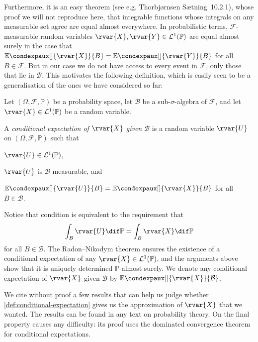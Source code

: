 \documentclass[article, a4paper, 11pt, oneside]{memoir}
\numberwithin{equation}{chapter}
\newcommand{\calB}{\mathcal{B}}
\newcommand{\calF}{\mathcal{F}}
\newcommand{\calL}{\mathcal{L}}
\renewcommand{\P}{\mathbb{P}}
\newcommand{\condexp}[3][]{{\mathbb{E}\condexpaux[#1]{#2}{#3}}}
\begin{document}
Furthermore, it is an easy theorem (see e.g. Thorbjørnsen Sætning~10.2.1), whose proof we will not reproduce here, that integrable functions whose integrals on any measurable set agree are equal almost everywhere. In probabilistic terms, $\calF$-measurable random variables $\rvar{X}, \rvar{Y} \in \calL^1(\P)$ are equal almost surely in the case that $\condexp{\rvar{X}}{B} = \condexp{\rvar{Y}}{B}$ for all $B \in \calF$. But in our case we do not have access to every event in $\calF$, only those that lie in $\calB$. This motivates the following definition, which is easily seen to be a generalisation of the ones we have considered so far:

\begin{definition}
    \label{def:conditional-expectation}
    Let $(\Omega, \calF, \P)$ be a probability space, let $\calB$ be a sub-$\sigma$-algebra of $\calF$, and let $\rvar{X} \in \calL^1(\P)$ be a random variable.

    A \emph{conditional expectation of $\rvar{X}$ given $\calB$} is a random variable $\rvar{U}$ on $(\Omega, \calF, \P)$ such that
    \begin{enumdef}
        \item $\rvar{U} \in \calL^1(\P)$,
        \item $\rvar{U}$ is $\calB$-measurable, and
        \item \label{enum:conditional-expectation-local-approx} $\condexp{\rvar{U}}{B} = \condexp{\rvar{X}}{B}$ for all $B \in \calB$.
    \end{enumdef}
\end{definition}
%
Notice that condition  is equivalent to the requirement that
%
\begin{equation*}
    \int_B \rvar{U} \dif\P
        = \int_B \rvar{X} \dif\P
\end{equation*}
%
for all $B \in \calB$. The Radon--Nikodym theorem ensures the existence of a conditional expectation of any $\rvar{X} \in \calL^1(\P)$, and the arguments above show that it is uniquely determined $\P$-almost surely. We denote any conditional expectation of $\rvar{X}$ given $\calB$ by $\condexp{\rvar{X}}{\calB}$.

We cite without proof a few results that can help us judge whether \cref{def:conditional-expectation} gives us the approximation of $\rvar{X}$ that we wanted. The results can be found in any text on probability theory. On the final property causes any difficulty: its proof uses the dominated convergence theorem for conditional expectations.
\end{document}
